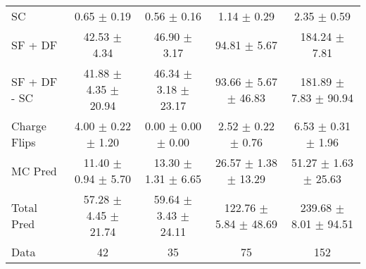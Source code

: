 \begin{tabular}{l|cccc}
                                 SC &  0.65 $\pm$  0.19 &  0.56 $\pm$  0.16 &  1.14 $\pm$  0.29 &  2.35 $\pm$  0.59 \\
                            SF + DF & 42.53 $\pm$  4.34 & 46.90 $\pm$  3.17 & 94.81 $\pm$  5.67 & 184.24 $\pm$  7.81 \\
\hline
                       SF + DF - SC & 41.88 $\pm$  4.35 $\pm$ 20.94 & 46.34 $\pm$  3.18 $\pm$ 23.17 & 93.66 $\pm$  5.67 $\pm$ 46.83 & 181.89 $\pm$  7.83 $\pm$ 90.94 \\
\hline\hline
                       Charge Flips &  4.00 $\pm$  0.22 $\pm$  1.20 &  0.00 $\pm$  0.00 $\pm$  0.00 &  2.52 $\pm$  0.22 $\pm$  0.76 &  6.53 $\pm$  0.31 $\pm$  1.96 \\
\hline
                            MC Pred & 11.40 $\pm$  0.94 $\pm$  5.70 & 13.30 $\pm$  1.31 $\pm$  6.65 & 26.57 $\pm$  1.38 $\pm$ 13.29 & 51.27 $\pm$  1.63 $\pm$ 25.63 \\
\hline
                         Total Pred & 57.28 $\pm$  4.45 $\pm$ 21.74 & 59.64 $\pm$  3.43 $\pm$ 24.11 & 122.76 $\pm$  5.84 $\pm$ 48.69 & 239.68 $\pm$  8.01 $\pm$ 94.51 \\
\hline\hline
                               Data &    42 &    35 &    75 &   152 \\
\hline\hline
\end{tabular}

